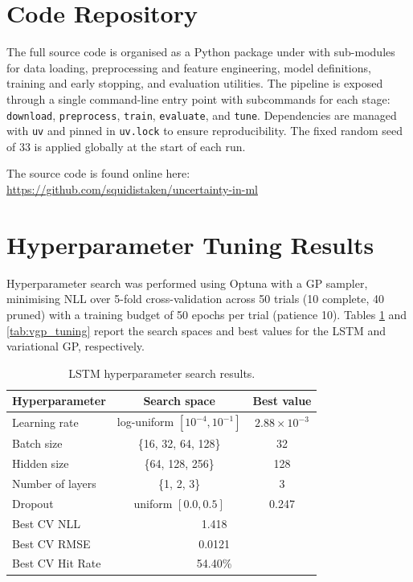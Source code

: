 \section{Code Repository}
\label{app:code}

The full source code is organised as a Python package under with sub-modules for data loading, preprocessing and feature engineering, model definitions, training and early stopping, and evaluation utilities. The pipeline is exposed through a single command-line entry point with subcommands for each stage: \texttt{download}, \texttt{preprocess}, \texttt{train}, \texttt{evaluate}, and \texttt{tune}. Dependencies are managed with \texttt{uv} and pinned in \texttt{uv.lock} to ensure reproducibility. The fixed random seed of 33 is applied globally at the start of each run.

The source code is found online here: \href{https://github.com/squidistaken/uncertainty-in-ml}{https://github.com/squidistaken/uncertainty-in-ml}

\section{Hyperparameter Tuning Results}
\label{app:hyperparameter_tuning}

Hyperparameter search was performed using Optuna with a GP sampler, minimising NLL over 5-fold cross-validation across 50 trials (10 complete, 40 pruned) with a training budget of 50 epochs per trial (patience 10). Tables \ref{tab:lstm_tuning} and \ref{tab:vgp_tuning} report the search spaces and best values for the LSTM and variational GP, respectively.

\begin{table}[H]
    \centering
    \begin{tabular}{lcc}
        \toprule
        \textbf{Hyperparameter} & \textbf{Search space} & \textbf{Best value} \\
        \midrule
        Learning rate           & log-uniform $[10^{-4}, 10^{-1}]$ & $2.88 \times 10^{-3}$ \\
        Batch size              & \{16, 32, 64, 128\}              & 32 \\
        Hidden size             & \{64, 128, 256\}                 & 128 \\
        Number of layers        & \{1, 2, 3\}                      & 3 \\
        Dropout                 & uniform $[0.0, 0.5]$             & 0.247 \\
        \midrule
        Best CV NLL             & \multicolumn{2}{c}{1.418} \\
        Best CV RMSE            & \multicolumn{2}{c}{0.0121} \\
        Best CV Hit Rate        & \multicolumn{2}{c}{54.40\%} \\
        \bottomrule
    \end{tabular}
    \caption{LSTM hyperparameter search results.}
    \label{tab:lstm_tuning}
\end{table}

